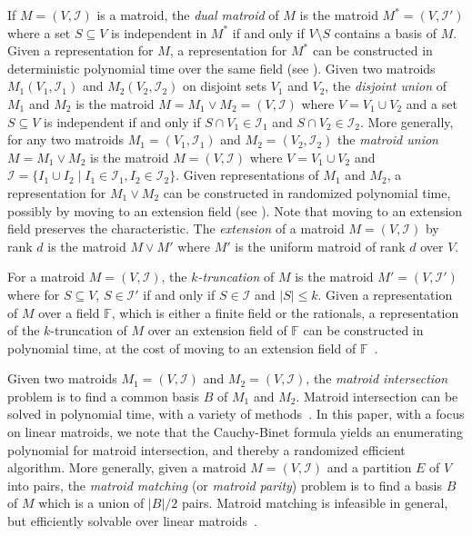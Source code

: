 \documentclass[10pt,a4paper]{article}
\newcommand{\F}{\ensuremath{\mathbb F}\xspace}
\newcommand{\cI}{\ensuremath{\mathcal I}\xspace}
\begin{document}
If $M=(V,\cI)$ is a matroid, the \emph{dual matroid} of $M$ is
the matroid $M^*=(V,\cI')$ where a set $S \subseteq V$ is independent
in $M^*$ if and only if $V \setminus S$ contains a basis of $M$. 
Given a representation for $M$, a representation for $M^*$ can be
constructed in deterministic polynomial time over the same field (see \cite{OxleyBook}).  
Given two matroids $M_1(V_1,\cI_1)$ and $M_2(V_2,\cI_2)$ on disjoint
sets $V_1$ and $V_2$, the \emph{disjoint union} of $M_1$ and $M_2$ is
the matroid $M=M_1 \lor M_2=(V,\cI)$ where $V=V_1 \cup V_2$
and a set $S \subseteq V$ is independent if and only if
$S \cap V_1 \in \cI_1$ and $S \cap V_2 \in \cI_2$. 
More generally, for any two matroids $M_1=(V_1,\cI_1)$ and $M_2=(V_2,\cI_2)$
the \emph{matroid union} $M=M_1 \lor M_2$ is the matroid $M=(V,\cI)$
where $V=V_1 \cup V_2$ and $\cI=\{I_1 \cup I_2 \mid I_1 \in \cI_1, I_2 \in \cI_2\}$. 
Given representations of $M_1$ and $M_2$, a representation for $M_1 \lor M_2$
can be constructed in randomized polynomial time, possibly
by moving to an extension field (see \cite{OxleyBook}).  
Note that moving to an extension field preserves the characteristic.
The \emph{extension} of a matroid $M=(V,\cI)$ by rank $d$ is the matroid $M \lor M'$
where $M'$ is the uniform matroid of rank $d$ over $V$. 

For a matroid $M=(V,\cI)$, the \emph{$k$-truncation} of $M$
is the matroid $M'=(V,\cI')$ where for $S \subseteq V$,
$S \in \cI'$ if and only if $S \in \cI$ and $|S| \leq k$.
Given a representation of $M$ over a field $\F$, which is either
a finite field or the rationals, a representation of
the $k$-truncation of $M$ over an extension field of $\F$
can be constructed in polynomial time, at the cost of moving
to an extension field of $\F$~\cite{LokshtanovMPS18,Marx09-matroid}.

Given two matroids $M_1=(V,\cI)$ and $M_2=(V,\cI)$, the \emph{matroid
  intersection} problem is to find a common basis $B$ of $M_1$ and $M_2$.
Matroid intersection can be solved in polynomial time, with a variety
of methods~\cite{Schrijver}. In this paper, with a focus on linear
matroids, we note that the Cauchy-Binet formula yields an enumerating
polynomial for matroid intersection, and thereby a randomized
efficient algorithm. More generally, given a matroid $M=(V,\cI)$
and a partition $E$ of $V$ into pairs, the \emph{matroid matching}
(or \emph{matroid parity}) problem is to find a basis $B$ of $M$
which is a union of $|B|/2$ pairs. Matroid matching is infeasible in
general, but efficiently solvable over linear matroids~\cite{Lovasz79,Schrijver}.
\end{document}
